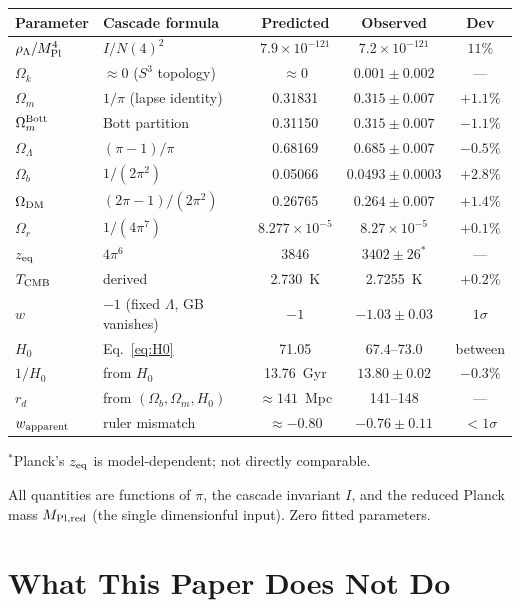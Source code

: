 \documentclass[12pt,a4paper]{article}
\begin{document}
\begin{center}
\small
\begin{tabular}{llccc}
\hline
Parameter & Cascade formula & Predicted & Observed & Dev \\
\hline
$\rho_\Lambda/M_{\rm Pl}^4$ & $I/N(4)^2$ & $7.9\times10^{-121}$ & $7.2\times10^{-121}$ & $11\%$ \\
$\Omega_k$ & $\approx0$ ($S^3$ topology) & $\approx0$ & $0.001\pm0.002$ & --- \\
$\Omega_m$ & $1/\pi$ (lapse identity) & 0.31831 & $0.315\pm0.007$ & $+1.1\%$ \\
$\Omega_m^{\rm Bott}$ & Bott partition & 0.31150 & $0.315\pm0.007$ & $-1.1\%$ \\
$\Omega_\Lambda$ & $(\pi-1)/\pi$ & 0.68169 & $0.685\pm0.007$ & $-0.5\%$ \\
$\Omega_b$ & $1/(2\pi^2)$ & 0.05066 & $0.0493\pm0.0003$ & $+2.8\%$ \\
$\Omega_{\rm DM}$ & $(2\pi-1)/(2\pi^2)$ & 0.26765 & $0.264\pm0.007$ & $+1.4\%$ \\
$\Omega_r$ & $1/(4\pi^7)$ & $8.277\times10^{-5}$ & $8.27\times10^{-5}$ & $+0.1\%$ \\
$z_{\rm eq}$ & $4\pi^6$ & 3846 & $3402\pm26^*$ & --- \\
$T_{\rm CMB}$ & derived & 2.730~K & 2.7255~K & $+0.2\%$ \\
$w$ & $-1$ (fixed $\Lambda$, GB vanishes) & $-1$ & $-1.03\pm0.03$ & $1\sigma$ \\
$H_0$ & Eq.~\eqref{eq:H0} & 71.05 & 67.4--73.0 & between \\
$1/H_0$ & from $H_0$ & 13.76~Gyr & $13.80\pm0.02$ & $-0.3\%$ \\
$r_d$ & from $(\Omega_b,\Omega_m,H_0)$ & $\approx141$~Mpc & 141--148 & --- \\
$w_{\rm apparent}$ & ruler mismatch & $\approx-0.80$ & $-0.76\pm0.11$ & $<1\sigma$ \\
\hline
\end{tabular}
\end{center}
\noindent$^*$Planck's $z_{\rm eq}$ is model-dependent; not directly comparable.

\medskip All quantities are functions of $\pi$, the cascade invariant $I$, and the reduced
Planck mass $M_{\rm Pl,red}$ (the single dimensionful input). Zero fitted parameters.

\section{What This Paper Does Not Do}
\end{document}
